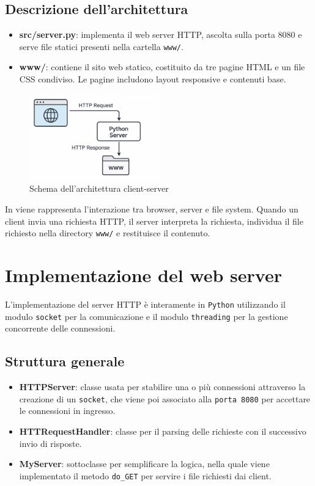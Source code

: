 \documentclass[a4paper,12pt]{report}
\begin{document}
\section{Descrizione dell'architettura}
\begin{itemize}
    \item \textbf{src/server.py}: implementa il web server HTTP, ascolta sulla porta 8080 e serve file
          statici presenti nella cartella \texttt{www/}.
    \item \textbf{www/}: contiene il sito web statico, costituito da tre pagine HTML e un file CSS
          condiviso. Le pagine includono layout responsive e contenuti base.
\end{itemize}

\begin{figure}[H]
    \centering
    \includegraphics[width=0.5\textwidth]{img/architettura.png}
    \caption{Schema dell'architettura client-server}
    \label{fig:architettura}
\end{figure}

In  viene rappresenta l'interazione tra browser, server e file system. Quando un client
invia una richiesta HTTP, il server interpreta la richiesta, individua il file richiesto nella directory \texttt{www/}
e restituisce il contenuto.

\chapter{Implementazione del web server}
L'implementazione del server HTTP è interamente in \texttt{Python} utilizzando il modulo \texttt{socket} per
la comunicazione e il modulo \texttt{threading} per la gestione concorrente delle connessioni.

\section{Struttura generale}
\begin{itemize}
    \item \textbf{HTTPServer}: classe usata per stabilire una o più connessioni \newline attraverso la creazione di
          un \texttt{socket}, che viene poi associato alla \texttt{porta 8080} per accettare le connessioni in ingresso.
    \item \textbf{HTTRequestHandler}: classe per il parsing delle richieste con il successivo invio di risposte.
    \item \textbf{MyServer}: sottoclasse per semplificare la logica, nella quale viene implementato il
          metodo \texttt{do\_GET} per servire i file richiesti dai client.
\end{itemize}
\end{document}
